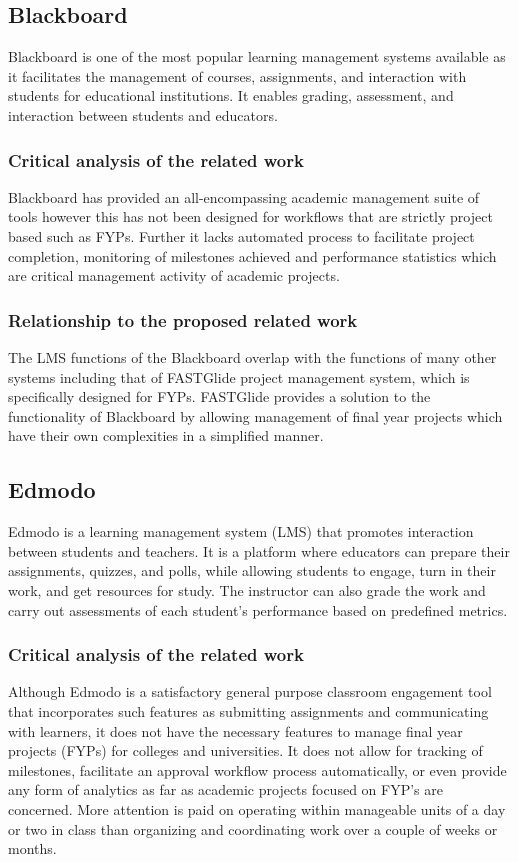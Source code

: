 \documentclass{FastFyp}
\begin{document}
\subsection{Blackboard}
Blackboard \cite{ref:blackboard} is one of the most popular learning management systems available as it facilitates the management of courses, assignments, and interaction with students for educational institutions. It enables grading, assessment, and interaction between students and educators.
\subsubsection{Critical analysis of the related work}
Blackboard has provided an all-encompassing academic management suite of tools however this has not been designed for workflows that are strictly project based such as FYPs. Further it lacks automated process to facilitate project completion, monitoring of milestones achieved and performance statistics which are critical management activity of academic projects.
\subsubsection{Relationship to the proposed related work}
The LMS functions of the Blackboard overlap with the functions of many other systems including that of FASTGlide project management system, which is specifically designed for FYPs. FASTGlide provides a solution to the functionality of Blackboard by allowing management of final year projects which have their own complexities in a simplified manner.
\subsection{Edmodo}
Edmodo \cite{ref:edmodo} is a learning management system (LMS) that promotes interaction between students and teachers. It is a platform where educators can prepare their assignments, quizzes, and polls, while allowing students to engage, turn in their work, and get resources for study. The instructor can also grade the work and carry out assessments of each student’s performance based on predefined metrics.
\subsubsection{Critical analysis of the related work}
Although Edmodo is a satisfactory general purpose classroom engagement tool that incorporates such features as submitting assignments and communicating with learners, it does not have the necessary features to manage final year projects (FYPs) for colleges and universities. It does not allow for tracking of milestones, facilitate an approval workflow process automatically, or even provide any form of analytics as far as academic projects focused on FYP’s are concerned. More attention is paid on operating within manageable units of a day or two in class than organizing and coordinating work over a couple of weeks or months.
\end{document}
